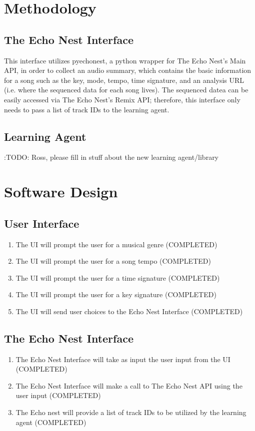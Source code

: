 \documentclass{article}
\begin{document}
\section{Methodology}
\subsection{The Echo Nest Interface}
This interface utilizes pyechonest, a python wrapper for The Echo Nest's Main API, in order to collect an 
audio summary, which contains the basic information for a song such as the key, mode, tempo, time signature, 
and an analysis URL (i.e. where the sequenced data for each song lives). The sequenced datea
can be easily accessed via The Echo Nest's Remix API; therefore, this interface only needs to pass a list of
track IDs to the learning agent.

\subsection{Learning Agent}
\text:{TODO: Ross, please fill in stuff about the new learning agent/library}

\section{Software Design}
\subsection{User Interface}
\begin{enumerate}
\item The UI will prompt the user for a musical genre (COMPLETED)
\item The UI will prompt the user for a song tempo (COMPLETED)
\item The UI will prompt the user for a time signature (COMPLETED)
\item The UI will prompt the user for a key signature (COMPLETED)
\item The UI will send user choices to the Echo Nest Interface (COMPLETED)
\end{enumerate}

\subsection{The Echo Nest Interface}
\begin{enumerate}
\item The Echo Nest Interface will take as input the user input from the UI (COMPLETED)
\item The Echo Nest Interface will make a call to The Echo Nest API using the user input (COMPLETED)
\item The Echo nest will provide a list of track IDs to be utilized by the learning agent (COMPLETED)
\end{enumerate}
\end{document}
